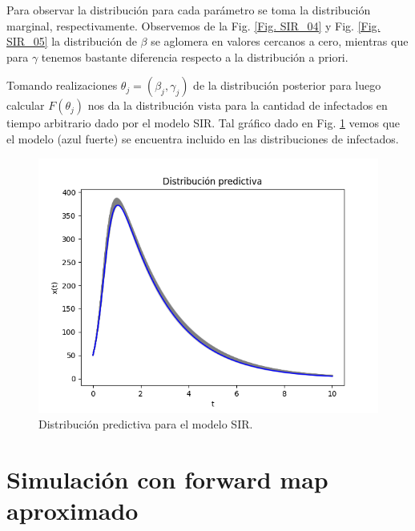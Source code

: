 Para observar la distribución para cada parámetro se toma la distribución marginal, respectivamente. Observemos de la Fig. \ref{Fig. SIR_04} y Fig. \ref{Fig. SIR_05} la distribución de $\beta$ se aglomera en valores cercanos a cero, mientras que para $\gamma$ tenemos bastante diferencia respecto a la distribución a priori.

Tomando realizaciones $ \theta_j = (\beta_j,\gamma_j)$ de la distribución posterior para luego calcular $F(\theta_j)$ nos da la distribución vista para la cantidad de infectados en tiempo arbitrario dado por el modelo SIR. Tal gráfico dado en Fig. \ref{Fig. SIR_06} vemos que el modelo (azul fuerte) se encuentra incluido en las distribuciones de infectados.

\begin{figure}[H] 
    \centering 
    \includegraphics[width = 10 cm ]{img/Exp_Central_SIR_sigma/Figuras/Generales/Predictiva_SIR_sigma.png} 
    \caption{Distribución predictiva para el modelo SIR.}
    \label{Fig. SIR_06}
\end{figure} 


\section{Simulación con forward map aproximado}




